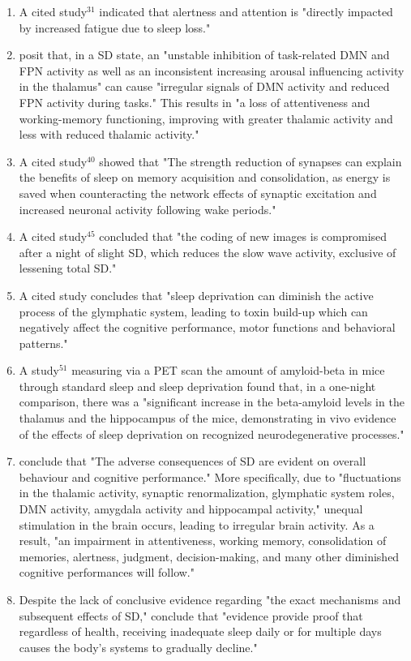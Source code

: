 \begin{enumerate}
	\item A cited study$^{31}$ indicated that alertness and attention is "directly impacted by increased fatigue due to sleep loss."

	\item \citeauthor{1} posit that, in a SD state, an "unstable inhibition of task-related DMN and FPN activity as well as an inconsistent increasing arousal influencing activity in the thalamus" can cause "irregular signals of DMN activity and reduced FPN activity during tasks." This results in "a loss of attentiveness and working-memory functioning, improving with greater thalamic activity and less with reduced thalamic activity."

	\item A cited study$^{40}$ showed that "The strength reduction of synapses can explain the benefits of sleep on memory acquisition and consolidation, as energy is saved when counteracting the network effects of synaptic excitation and increased neuronal activity following wake periods."

	\item A cited study$^{45}$ concluded that "the coding of new images is compromised  after a night of slight SD, which reduces the slow wave  activity, exclusive of lessening total SD."

	\item A cited study concludes that "sleep deprivation can diminish the active process of the glymphatic system, leading to toxin build-up which can negatively affect the cognitive performance, motor functions and behavioral patterns."

	\item A study$^{51}$ measuring via a PET scan the amount of amyloid-beta in mice through standard sleep and sleep deprivation found that, in a one-night comparison, there was a "significant increase in the beta-amyloid levels in the thalamus and the hippocampus of the mice, demonstrating in vivo evidence of the effects of sleep deprivation on recognized neurodegenerative processes."

	\item \citeauthor{1} conclude that "The adverse consequences of SD are evident on overall behaviour and cognitive performance." More specifically, due to "fluctuations in the thalamic activity, synaptic renormalization, glymphatic system roles, DMN activity, amygdala activity and hippocampal activity," unequal stimulation in the brain occurs, leading to irregular brain activity. As a result, "an impairment in attentiveness, working memory, consolidation of memories, alertness, judgment, decision-making, and many other diminished cognitive performances will follow."

	\item Despite the lack of conclusive evidence regarding "the exact mechanisms and subsequent effects of SD," \citeauthor{1} conclude that "evidence provide proof that regardless of health, receiving inadequate sleep daily or for multiple days causes the body’s systems to gradually  decline." 

\end{enumerate}

